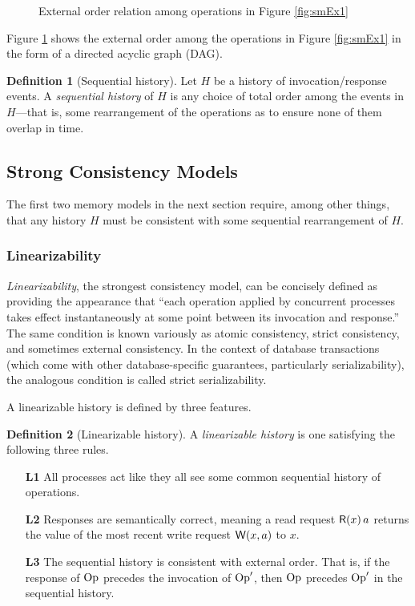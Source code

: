 \documentclass[]             %
{NASA}                       %
\theoremstyle{definition}
\newtheorem{definition}{Definition}[section]
\providecommand{\tightlist}{%
  \setlength{\itemsep}{0pt}\setlength{\parskip}{0pt}}
\begin{document}
\begin{figure}
    \centering
    
    \caption{External order relation among operations in Figure \ref{fig:smEx1}}
    \label{fig:smEx1DAG}
\end{figure}

Figure \ref{fig:smEx1DAG} shows the external order among the
operations in Figure \ref{fig:smEx1} in the form of a directed
acyclic graph (DAG).

\begin{definition}[Sequential history]
  Let $H$ be a history of invocation/response events. A
  \emph{sequential history} of $H$ is any choice of total order among
  the events in $H$---that is, some rearrangement of the operations as
  to ensure none of them overlap in time.
\end{definition}

\subsection{Strong Consistency Models}
The first two memory models in the next section require, among other
things, that any history $H$ must be consistent with some sequential
rearrangement of $H$.

\subsubsection{Linearizability}
\label{sssec:linearizability}

\emph{Linearizability}, the strongest consistency model, can be
concisely defined as providing the appearance that ``each operation
applied by concurrent processes takes effect instantaneously at some
point between its invocation and response.''
\cite{10.1145/78969.78972} The same condition is known variously as
atomic consistency, strict consistency, and sometimes external
consistency. In the context of database transactions (which come with
other database-specific guarantees, particularly serializability), the
analogous condition is called strict serializability.

A linearizable history is defined by three features.
\begin{definition}[Linearizable history]
  \label{def:linearizable}
  A \emph{linearizable history} is one satisfying the following three rules.
\begin{enumerate}
  \tightlist
\item[\textbf{L1}] All processes act like they all see some common sequential
  history of operations.
\item[\textbf{L2}] Responses are semantically correct, meaning a read request
  \(\mathsf{R}\!\left(x\right){a}\) returns the value of the most recent write request
  \(\mathsf{W}\!\left(x, a\right)\) to \(x\).
\item[\textbf{L3}] The sequential history is consistent with external
  order. That is, if the response of $\mathrm{Op}$ precedes the invocation of
  $\mathrm{Op}'$, then $\mathrm{Op}$ precedes $\mathrm{Op}'$ in the sequential history.
\end{enumerate}
\end{definition}
\end{document}
